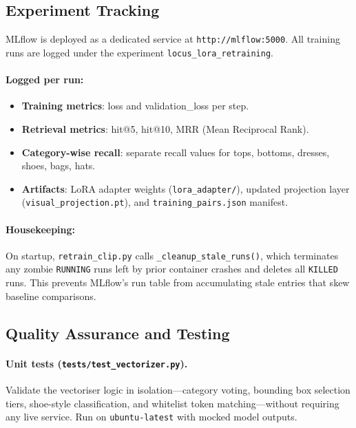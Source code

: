\documentclass[12pt]{article}
\begin{document}
\subsection{Experiment Tracking}

MLflow is deployed as a dedicated service at \texttt{http://mlflow:5000}. All training runs are logged under the experiment \texttt{locus\_lora\_retraining}.

\paragraph{Logged per run:}
\begin{itemize}[leftmargin=*, itemsep=1pt]
  \item \textbf{Training metrics}: loss and validation\_loss per step.
  \item \textbf{Retrieval metrics}: hit@5, hit@10, MRR (Mean Reciprocal Rank).
  \item \textbf{Category-wise recall}: separate recall values for tops, bottoms, dresses, shoes, bags, hats.
  \item \textbf{Artifacts}: LoRA adapter weights (\texttt{lora\_adapter/}), updated projection layer (\texttt{visual\_projection.pt}), and \texttt{training\_pairs.json} manifest.
\end{itemize}

\paragraph{Housekeeping:} On startup, \texttt{retrain\_clip.py} calls \texttt{\_cleanup\_stale\_runs()}, which terminates any zombie \texttt{RUNNING} runs left by prior container crashes and deletes all \texttt{KILLED} runs. This prevents MLflow's run table from accumulating stale entries that skew baseline comparisons.

\subsection{Quality Assurance and Testing}

\paragraph{Unit tests (\texttt{tests/test\_vectorizer.py}).}
Validate the vectoriser logic in isolation---category voting, bounding box selection tiers, shoe-style classification, and whitelist token matching---without requiring any live service. Run on \texttt{ubuntu-latest} with mocked model outputs.
\end{document}
